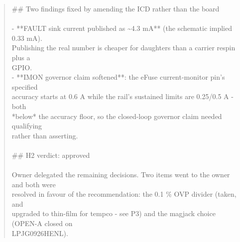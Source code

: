 \documentclass[11pt,a4paper]{article}
\begin{document}
\begin{quote}
\#\# Two findings fixed by amending the ICD rather than the board\\
~\\
- {*}{*}FAULT sink current published as \textasciitilde{}4.3 mA{*}{*} (the schematic implied 0.33 mA).\\
  Publishing the real number is cheaper for daughters than a carrier respin plus a\\
  GPIO.\\
- {*}{*}IMON governor claim softened{*}{*}: the eFuse current-monitor pin's specified\\
  accuracy starts at 0.6 A while the rail's sustained limits are 0.25/0.5 A - both\\
  {*}below{*} the accuracy floor, so the closed-loop governor claim needed qualifying\\
  rather than asserting.\\
~\\
\#\# H2 verdict: approved\\
~\\
Owner delegated the remaining decisions. Two items went to the owner and both were\\
resolved in favour of the recommendation: the 0.1 \% OVP divider (taken, and\\
upgraded to thin-film for tempco - see P3) and the magjack choice (OPEN-A closed on\\
LPJG0926HENL).
\end{quote}
\end{document}
